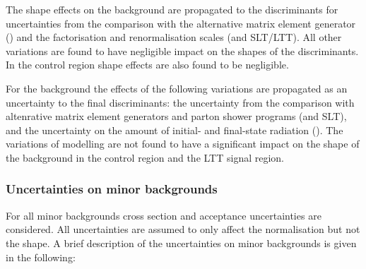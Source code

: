 The shape effects on the \ZHF background are propagated to the
discriminants for uncertainties from the comparison with the
alternative matrix element generator (\hadhad) and the factorisation
and renormalisation scales (\hadhad and \lephad SLT/LTT). All other
variations are found to have negligible impact on the shapes of the
discriminants. In the \ZHF control region shape effects are also found
to be negligible.

For the \ttbar background the effects of the following variations are
propagated as an uncertainty to the final discriminants: the
uncertainty from the comparison with altenrative matrix element
generators and parton shower programs (\hadhad and \lephad SLT), and
the uncertainty on the amount of initial- and final-state radiation
(\hadhad). The variations of \ttbar modelling are not found to have a
significant impact on the shape of the background in the \ZHF control
region and the LTT signal region.


%
%
%
%

\subsubsection{Uncertainties on minor backgrounds}

For all minor backgrounds cross section and acceptance uncertainties
are considered. All uncertainties are assumed to only affect the
normalisation but not the shape.    A brief
description of the uncertainties on minor backgrounds is given in the
following:


